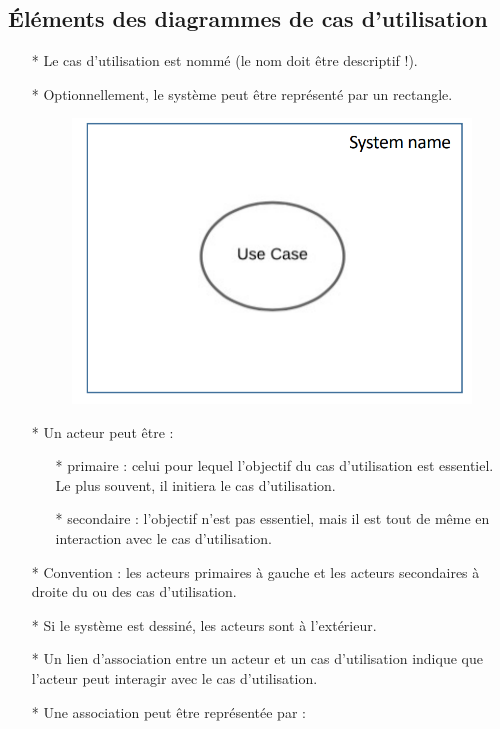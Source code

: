 \documentclass[12pt]{article}
\begin{document}
\subsection{Éléments des diagrammes de cas d'utilisation}
\newpage
\begin{itemize}
	\item [*] Le cas d'utilisation est nommé (le nom doit être descriptif !).
	\item [*] Optionnellement, le système peut être représenté par un rectangle. 
	\begin{figure}[!hbtp]
	\includegraphics[scale=0.75]{Capture1.PNG}	
	\end{figure}
	\item [*] Un acteur peut être :
	\begin{itemize}
		\item [*] primaire : celui pour lequel l'objectif du cas d'utilisation est essentiel. Le plus souvent, il initiera
		le cas d'utilisation.
		\item [*] secondaire : l'objectif n'est pas essentiel, mais il est tout de même en interaction avec le cas d'utilisation.
	\end{itemize}
\item [*] Convention : les acteurs primaires à gauche et les acteurs secondaires à droite du ou des
cas d'utilisation.
\item [*] Si le système est dessiné, les acteurs sont à l'extérieur.
\item [*] Un lien d'association entre un acteur et un cas d'utilisation indique que l'acteur peut
interagir avec le cas d'utilisation.
\item [*] Une association peut être représentée par :

\end{itemize}
\end{document}
